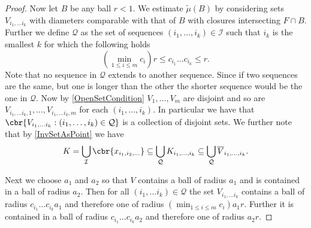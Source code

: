 \begin{proof}
	Now let $B$ be any ball $r < 1$. We estimate $\tilde{\mu}(B)$ by considering sets $V_{i_1, \ldots i_k}$ with diameters comparable with that of $B$ with closures intersecting $F \cap B$. Further we define $\mathcal{Q}$ as the set of sequences $(i_1, \ldots, i_k) \in \mathcal{I}$ such that $i_k$ is the smallest $k$ for which the following holds
	\begin{equation}
		\left(\min_{1 \leq i \leq m} c_i\right) r \leq c_{i_1} \dots c_{i_k} \leq r.
	\end{equation}
	Note that no sequence in $\mathcal{Q}$ extends to another sequence. Since if two sequences are the same, but one is longer than the other the shorter sequence would be the one in $\mathcal{Q}$.  Now by \cref{OpenSetCondition} $V_1, \ldots, V_m$ are disjoint and so are $V_{i_1, \ldots i_k, 1}, \ldots, V_{i_1, \ldots i_k, m}$ for each $(i_1, \ldots, i_k)$. In particular we have that $\cbr{V_{i_1, \ldots i_k} : (i_1, \ldots, i_k) \in \mathcal{Q}}$ is a collection of disjoint sets. We further note that by \eqref{InvSetAsPoint} we have
	\begin{equation}\label{KasCompactV}
		K = \bigcup_{\mathcal{I}} \cbr{x_{i_1, i_2, \ldots}} \subseteq \bigcup_{\mathcal{Q}} K_{i_1, \ldots, i_k} \subseteq \bigcup_{\mathcal{Q}} \overline{V}_{i_1, \ldots, i_k}.
	\end{equation}
	
	Next we choose $a_1$ and $a_2$ so that $V$ contains a ball of radius $a_1$ and is contained in a ball of radius $a_2$. Then for all $(i_1, \ldots i_k) \in \mathcal{Q}$ the set $V_{i_1, \ldots i_k}$ contains a ball of radius $c_{i_1} \dots c_{i_k} a_1$ and therefore one of radius $\left(\min_{1 \leq i \leq m} c_i\right) a_1 r$. Further it is contained in a ball of radius $c_{i_1} \dots c_{i_k} a_2$ and therefore one of radius $a_2 r$.
	

\end{proof}
